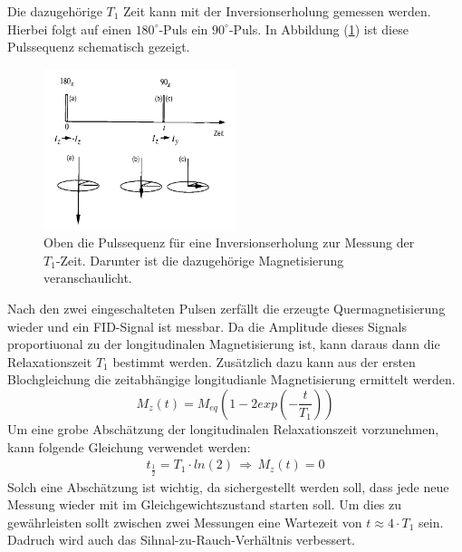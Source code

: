Die dazugeh\"{o}rige $T_1$ Zeit kann mit der Inversionserholung gemessen werden.
Hierbei folgt auf einen $180^{\circ}$-Puls ein $90^{\circ}$-Puls.
In Abbildung (\ref{inversion}) ist diese Pulssequenz schematisch gezeigt.
\begin{figure}
	\centering
	\includegraphics[width=0.5\textwidth]{Plots/inversionserholung.png}
	\caption{Oben die Pulssequenz f\"{u}r eine Inversionserholung zur Messung der $T_1$-Zeit. Darunter ist die dazugeh\"{o}rige Magnetisierung veranschaulicht.}
	\label{inversion}
\end{figure}
Nach den zwei eingeschalteten Pulsen zerf\"{a}llt die erzeugte Quer{\-}mag{\-}ne{\-}ti{\-}sie{\-}rung wieder und ein FID-Signal ist messbar.
Da die Amplitude dieses Signals proportiuonal zu der longitudinalen Magnetisierung ist, kann daraus dann die Relaxationszeit $T_1$ bestimmt werden.
Zus\"{a}tzlich dazu kann aus der ersten Blochgleichung die zeitabh\"{a}ngige longitudianle Magnetisierung ermittelt werden.
\begin{equation*}
	\label{eq:Mz}
	M_z(t) = M_{eq} \left(1 - 2 exp\left( - \frac{t}{T_1} \right) \right)
\end{equation*}
Um eine grobe Absch\"{a}tzung der longitudinalen Relaxationszeit vorzunehmen, kann folgende Gleichung verwendet werden:
\begin{align*}
	t_{\frac{1}{2}} = T_1 \cdot ln(2) \, \Rightarrow \, M_z(t) = 0
\end{align*}
Solch eine Absch\"{a}tzung ist wichtig, da sichergestellt werden soll, dass jede neue Messung wieder mit im Gleichgewichtszustand starten soll.
Um dies zu gew\"{a}hrleisten sollt zwischen zwei Messungen eine Wartezeit von $t \approx 4 \cdot T_1$ sein.
Dadruch wird auch das Sihnal-zu-Rauch-Verh\"{a}ltnis verbessert.

